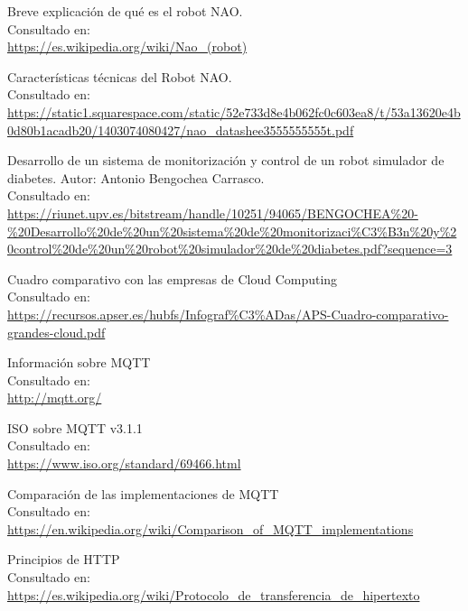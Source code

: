 \documentclass[12pt,spanish,listoffigures,listoftables]{tfgetsinf}
\begin{document}
\begin{thebibliography}{10}

   Breve explicación de qué es el robot NAO. \\
   \newblock Consultado en: \\ 
   \url{https://es.wikipedia.org/wiki/Nao_(robot)}
   
	Características técnicas del Robot NAO. \\
	\newblock Consultado en: \\
   	\url{https://static1.squarespace.com/static/52e733d8e4b062fc0c603ea8/t/53a13620e4b0d80b1acadb20/1403074080427/nao_datashee3555555555t.pdf}

	Desarrollo de un sistema de monitorización y control de un robot simulador de diabetes. Autor: Antonio Bengochea Carrasco. \\
	\newblock Consultado en: \\
	\url{https://riunet.upv.es/bitstream/handle/10251/94065/BENGOCHEA\%20-\%20Desarrollo\%20de\%20un\%20sistema\%20de\%20monitorizaci\%C3\%B3n\%20y\%20control\%20de\%20un\%20robot\%20simulador\%20de\%20diabetes.pdf?sequence=3}
	
	Cuadro comparativo con las empresas de Cloud Computing \\
	\newblock Consultado en: \\
	\url{https://recursos.apser.es/hubfs/Infograf\%C3\%ADas/APS-Cuadro-comparativo-grandes-cloud.pdf}
	
	Información sobre MQTT \\
	\newblock Consultado en: \\
	\url{http://mqtt.org/}
	
	ISO sobre MQTT v3.1.1 \\
	\newblock Consultado en: \\
	\url{https://www.iso.org/standard/69466.html}
	
	Comparación de las implementaciones de MQTT \\
	\newblock Consultado en: \\
	\url{https://en.wikipedia.org/wiki/Comparison_of_MQTT_implementations}

	Principios de HTTP \\
	\newblock Consultado en: \\
	\url{https://es.wikipedia.org/wiki/Protocolo_de_transferencia_de_hipertexto}
	

\end{thebibliography}
\end{document}

